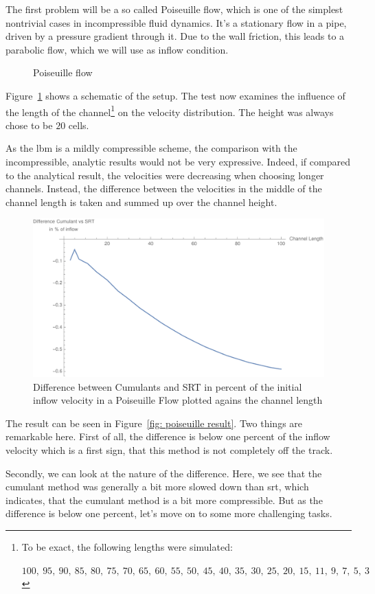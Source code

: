 The first problem will be a so called Poiseuille flow, which is one of the simplest nontrivial cases in incompressible fluid dynamics.
It's a stationary flow in a pipe, driven by a pressure gradient through it.
Due to the wall friction, this leads to a parabolic flow, which we will use as inflow condition.

\begin{figure}
  \centering
  
  \caption{Poiseuille flow}
\label{fig: poiseuille}
\end{figure}

Figure~\ref{fig: poiseuille} shows a schematic of the setup.
The test now examines the influence of the length of the channel\footnote{To be exact, the following lengths were simulated:\par
 $100,\ 95,\ 90,\ 85,\ 80,\ 75,\ 70,\ 65,\ 60,\ 55,\ 50,\ 45,\ 40,\ 35,\ 30,\ 25,\ 20,\ 15,\ 11,\ 9,\ 7,\ 5,\ 3$
} on the velocity distribution.
The height was always chose to be $20$ cells.

As the \gls{lbm} is a mildly compressible scheme, the comparison with the incompressible, analytic results would not be very expressive.
Indeed, if compared to the analytical result, the velocities were decreasing when choosing longer channels.
Instead, the difference between the velocities in the middle of the channel length is taken and summed up over the channel height.

\begin{figure}
  \centering
  \includegraphics[width=0.8\linewidth]{../figures/poiseuille.pdf} %
  \caption{Difference between Cumulants and SRT in percent of the initial inflow velocity in a Poiseuille Flow plotted agains the channel length}
\label{fig: poiseuille result}
\end{figure}

The result can be seen in Figure~\eqref{fig: poiseuille result}.
Two things are remarkable here.
First of all, the difference is below one percent of the inflow velocity which is a first sign, that this method is not completely off the track.

Secondly, we can look at the nature of the difference.
Here, we see that the cumulant method was generally a bit more slowed down than \gls{srt}, which indicates, that the cumulant method is a bit more compressible.
But as the difference is below one percent, let's move on to some more challenging tasks.
